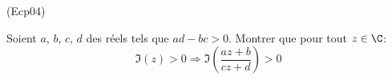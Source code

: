\begin{tiny}(Ecp04)\end{tiny} Soient $a$, $b$, $c$, $d$ des réels tels que $ad-bc>0$. Montrer que pour tout $z\in \C$:
\begin{displaymath}
 \Im(z)>0 \Rightarrow \Im\left( \frac{az+b}{cz+d}\right) >0 
\end{displaymath}

